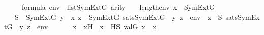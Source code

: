 \begin{isabellebody}
\ \ \ {\isachardoublequoteopen}{\isasymphi}\ {\isasymin}\ formula{\isachardoublequoteclose}\ {\isachardoublequoteopen}env\ {\isasymin}\ list{\isacharparenleft}{\kern0pt}SymExt{\isacharparenleft}{\kern0pt}G{\isacharparenright}{\kern0pt}{\isacharparenright}{\kern0pt}{\isachardoublequoteclose}\ {\isachardoublequoteopen}arity{\isacharparenleft}{\kern0pt}{\isasymphi}{\isacharparenright}{\kern0pt}\ {\isasymle}\ {}\ {\isacharhash}{\kern0pt}{\isacharplus}{\kern0pt}\ length{\isacharparenleft}{\kern0pt}env{\isacharparenright}{\kern0pt}{\isachardoublequoteclose}\ {\isachardoublequoteopen}x\ {\isasymin}\ SymExt{\isacharparenleft}{\kern0pt}G{\isacharparenright}{\kern0pt}{\isachardoublequoteclose}\ \isanewline
\ \ \ {\isachardoublequoteopen}{\isasymexists}S\ {\isasymin}\ SymExt{\isacharparenleft}{\kern0pt}G{\isacharparenright}{\kern0pt}{\isachardot}{\kern0pt}\ {\isasymforall}y\ {\isasymin}\ x{\isachardot}{\kern0pt}\ {\isacharparenleft}{\kern0pt}{\isacharparenleft}{\kern0pt}{\isasymexists}z\ {\isasymin}\ SymExt{\isacharparenleft}{\kern0pt}G{\isacharparenright}{\kern0pt}{\isachardot}{\kern0pt}\ sats{\isacharparenleft}{\kern0pt}SymExt{\isacharparenleft}{\kern0pt}G{\isacharparenright}{\kern0pt}{\isacharcomma}{\kern0pt}\ {\isasymphi}{\isacharcomma}{\kern0pt}\ {\isacharbrackleft}{\kern0pt}y{\isacharcomma}{\kern0pt}\ z{\isacharbrackright}{\kern0pt}\ {\isacharat}{\kern0pt}\ env{\isacharparenright}{\kern0pt}{\isacharparenright}{\kern0pt}\ {\isasymlongleftrightarrow}\ {\isacharparenleft}{\kern0pt}{\isasymexists}z\ {\isasymin}\ S{\isachardot}{\kern0pt}\ sats{\isacharparenleft}{\kern0pt}SymExt{\isacharparenleft}{\kern0pt}G{\isacharparenright}{\kern0pt}{\isacharcomma}{\kern0pt}\ {\isasymphi}{\isacharcomma}{\kern0pt}\ {\isacharbrackleft}{\kern0pt}y{\isacharcomma}{\kern0pt}\ z{\isacharbrackright}{\kern0pt}\ {\isacharat}{\kern0pt}\ env{\isacharparenright}{\kern0pt}{\isacharparenright}{\kern0pt}{\isacharparenright}{\kern0pt}{\isachardoublequoteclose}\isanewline
%
\isadelimproof
%
\endisadelimproof
%
\isatagproof
{}\isamarkupfalse%
\ {\isacharminus}{\kern0pt}\ \isanewline
\ \ \isamarkupfalse%
\ x{\isacharprime}{\kern0pt}\ \ x{\isacharprime}{\kern0pt}H\ {\isacharcolon}{\kern0pt}\ {\isachardoublequoteopen}x{\isacharprime}{\kern0pt}\ {\isasymin}\ HS{\isachardoublequoteclose}\ {\isachardoublequoteopen}val{\isacharparenleft}{\kern0pt}G{\isacharcomma}{\kern0pt}\ x{\isacharprime}{\kern0pt}{\isacharparenright}{\kern0pt}\ {\isacharequal}{\kern0pt}\ x{\isachardoublequoteclose}\ \isamarkupfalse%

\end{isabellebody}

